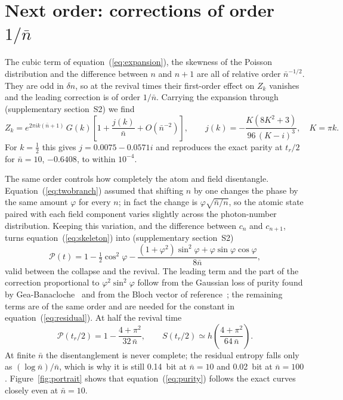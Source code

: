 \documentclass{iopjournal}
\newcommand{\nbar}{\bar{n}}
\begin{document}
\section{Next order: corrections of order $1/\nbar$}
\label{sec:next}

The cubic term of equation~(\ref{eq:expansion}), the skewness of the Poisson distribution and the difference between $n$ and $n+1$ are all of relative order $\nbar^{-1/2}$. They are odd in $\delta n$, so at the revival times their first-order effect on $Z_k$ vanishes and the leading correction is of order $1/\nbar$. Carrying the expansion through (supplementary section~S2) we find
\begin{equation}
Z_k = e^{2\pi ik(\nbar+1)}\,G(k)\left[1 + \frac{j(k)}{\nbar} + O(\nbar^{-2})\right],\qquad
j(k) = -\frac{K(8K^2+3)}{96\,(K-i)^3},\quad K = \pi k.
\label{eq:nextorder}
\end{equation}
For $k = \tfrac12$ this gives $j = 0.0075-0.0571i$ and reproduces the exact parity at $t_r/2$ for $\nbar = 10$, $-0.6408$, to within $10^{-4}$.

The same order controls how completely the atom and field disentangle. Equation~(\ref{eq:twobranch}) assumed that shifting $n$ by one changes the phase by the same amount $\varphi$ for every $n$; in fact the change is $\varphi\sqrt{\nbar/n}$, so the atomic state paired with each field component varies slightly across the photon-number distribution. Keeping this variation, and the difference between $c_n$ and $c_{n+1}$, turns equation~(\ref{eq:skeleton}) into (supplementary section~S2)
\begin{equation}
\mathcal{P}(t) = 1 - \tfrac{1}{2}\cos^2\varphi - \frac{(1+\varphi^2)\sin^2\varphi + \varphi\sin\varphi\cos\varphi}{8\nbar},
\label{eq:purity}
\end{equation}
valid between the collapse and the revival. The leading term and the part of the correction proportional to $\varphi^2\sin^2\varphi$ follow from the Gaussian loss of purity found by Gea-Banacloche~\cite{gea-banacloche1992} and from the Bloch vector of reference~\cite{kennedy2010}; the remaining terms are of the same order and are needed for the constant in equation~(\ref{eq:residual}). At half the revival time
\begin{equation}
\mathcal{P}(t_r/2) = 1 - \frac{4+\pi^2}{32\,\nbar},\qquad
S(t_r/2) \simeq h\!\left(\frac{4+\pi^2}{64\,\nbar}\right).
\label{eq:residual}
\end{equation}
At finite $\nbar$ the disentanglement is never complete; the residual entropy falls only as $(\log\nbar)/\nbar$, which is why it is still 0.14~bit at $\nbar = 10$ and 0.02~bit at $\nbar = 100$. Figure~\ref{fig:portrait} shows that equation~(\ref{eq:purity}) follows the exact curves closely even at $\nbar = 10$.
\end{document}

